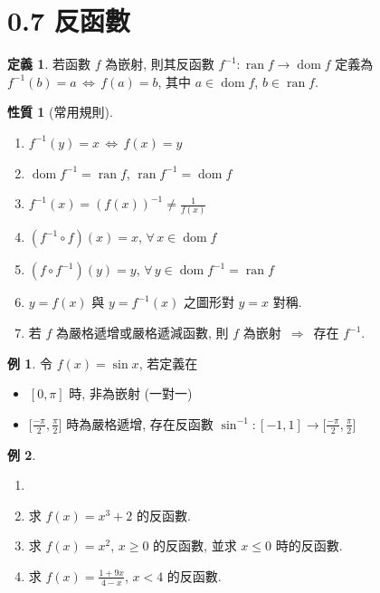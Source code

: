 \documentclass[12pt]{extarticle}
\newcommand{\ds}{\displaystyle}
\newcommand{\ie}{\,\Longrightarrow\,}
\newcommand{\ifff}{\,\Longleftrightarrow\,}
\DeclareMathOperator*{\dom}{dom}
\DeclareMathOperator*{\ran}{ran}
\theoremstyle{definition}
\newtheorem*{dfn}{定義}
\newtheorem*{prp}{性質}
\newtheorem*{ex}{例}
\begin{document}
\section*{0.7 反函數}

\begin{dfn}
  若函數 $f$ 為嵌射, 則其反函數 $f^{-1}:\ran f\to\dom f$ 定義為 $f^{-1}(b) = a \ifff f(a) = b$, 其中 $a\in\dom f$, $b\in\ran f$. 
\end{dfn}

\begin{prp}[常用規則] 
  \setlength{\columnsep}{-0mm}
  \begin{multicols}{2}
    \begin{enumerate}\setlength\itemsep{0em}
      \item $f^{-1}(y) = x \ifff f(x) = y$
      \item $\dom f^{-1} = \ran f$, $\ran f^{-1} = \dom f$
      \item $\ds f^{-1}(x) = (f(x))^{-1} \ne \frac{1}{f(x)} $
      \item $(f^{-1}\circ f)(x) = x$, $\forall\,x\in\dom f$
      \item $(f\circ f^{-1})(y) = y$, $\forall\,y\in\dom f^{-1} = \ran f$
      \item $y = f(x)$ 與 $y = f^{-1}(x)$ 之圖形對 $y = x$ 對稱. 
      \item 若 $f$ 為嚴格遞增或嚴格遞減函數, 則 $f$ 為嵌射 $\ie$ 存在 $f^{-1}$. 
    \end{enumerate}
  \end{multicols}
\end{prp}

\begin{ex}
  令 $f(x) = \sin x$, 若定義在
  \setlength{\columnsep}{-6cm}
  \begin{multicols}{2}
    \begin{itemize}\setlength\itemsep{0em}
      \item $[0, \pi]$ 時, 非為嵌射 (一對一) 
      \item $\big[\frac{-\pi}{2}, \frac{\pi}{2}\big]$ 時為嚴格遞增, 存在反函數 $\sin^{-1}:[-1, 1]\to\big[\frac{-\pi}{2}, \frac{\pi}{2}\big]$
    \end{itemize}
  \end{multicols}
\end{ex}

\begin{ex} 
    \begin{enumerate}\setlength\itemsep{0em}
      \item[]
      \item 求 $f(x) = x^3 + 2$ 的反函數. 
      \item 求 $f(x) = x^2$, $x\geqslant 0$ 的反函數, 並求 $x\leqslant 0$ 時的反函數.
      \item 求 $\ds f(x) = \frac{1 + 9 x}{4 - x}$, $x < 4$ 的反函數. 
    \end{enumerate}
\end{ex}
\end{document}
